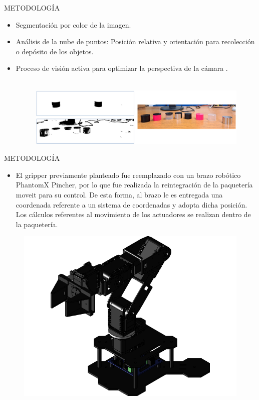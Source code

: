 \documentclass[handout,t]{beamer}
\begin{document}
\begin{frame}{METODOLOGÍA}
\begin{itemize}
    \item Segmentación por color de la imagen.
    \item Análisis de la nube de puntos: Posición relativa y orientación para recolección o depósito de los objetos. 
    \item Proceso de visión activa para optimizar la perspectiva de la cámara \cite{roveda_robot_2022}.
    \phantom{sd}\\
    \phantom{sd}\\
    \begin{figure}[htp]
    \centering
    \includegraphics[scale=0.25]{NewFigures/Filtered_R_B.png}
\end{figure}
    
\end{itemize}
\end{frame}

\begin{frame}{METODOLOGÍA}
\begin{itemize}
    \item El gripper previamente planteado fue reemplazado con un  brazo robótico PhantomX Pincher, por lo que fue realizada la reintegración de la paquetería moveit para su control. De esta forma, al brazo le es entregada una coordenada referente a un sistema de coordenadas y adopta dicha posición. Los cálculos referentes al movimiento de los actuadores se realizan dentro de la paquetería.\\
    \phantom{sd}

\end{itemize}
\begin{figure}[htp]
    \centering
    \includegraphics[scale=0.2]{NewerFigures/phantom.png} 
\end{figure}
\end{frame}
\end{document}
